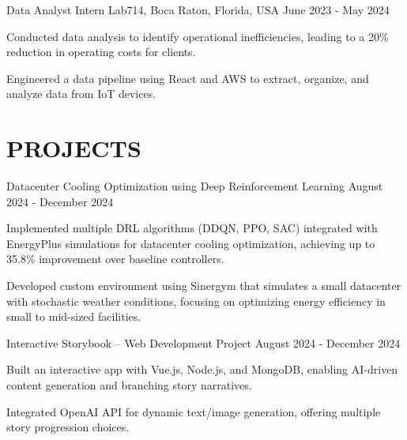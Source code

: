 \documentclass[10pt, letterpaper]{article}
\begin{document}
\vspace{\entrySpacing}
\begin{experienceentry}
    {Data Analyst Intern} %
    {Lab714, Boca Raton, Florida, USA} %
    {June 2023 - May 2024} %
    \item Conducted data analysis to identify operational inefficiencies, leading to a 20\% reduction in operating costs for clients.
    \item Engineered a data pipeline using React and AWS to extract, organize, and analyze data from IoT devices.
\end{experienceentry}

\vspace{\headerSpacing}

\section{PROJECTS}

\vspace{\entrySpacing}
\begin{projectentry}
    {Datacenter Cooling Optimization using Deep Reinforcement Learning} %
    {August 2024 - December 2024} %
    \item Implemented multiple DRL algorithms (DDQN, PPO, SAC) integrated with EnergyPlus simulations for datacenter cooling optimization, achieving up to 35.8\% improvement over baseline controllers.
    \item Developed custom environment using Sinergym that simulates a small datacenter with stochastic weather conditions, focusing on optimizing energy efficiency in small to mid-sized facilities.
\end{projectentry}

\vspace{\entrySpacing}
\begin{projectentry}
    {Interactive Storybook -- Web Development Project} %
    {August 2024 - December 2024} %
    \item Built an interactive app with Vue.js, Node.js, and MongoDB, enabling AI-driven content generation and branching story narratives.
    \item Integrated OpenAI API for dynamic text/image generation, offering multiple story progression choices.
\end{projectentry}
\end{document}
